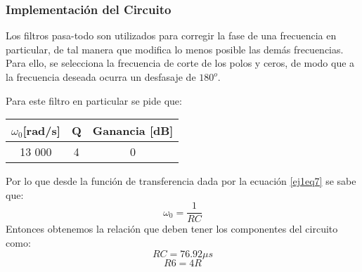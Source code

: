 \subsubsection{Implementación del Circuito}

Los filtros pasa-todo son utilizados para corregir la fase de una frecuencia en particular, de tal manera que modifica lo menos posible las demás frecuencias. Para ello, se selecciona la frecuencia de corte de los polos y ceros, de modo que a la frecuencia deseada ocurra un desfasaje de $180^o$. 

Para este filtro en particular se pide que:

\begin{table}[h]
\centering
\begin{tabular}{ccc}
\hline
$\omega_0${[}rad/s{]} & Q & Ganancia {[}dB{]} \\ \hline
13 000        & 4 & 0                 \\ \hline
\end{tabular}
\end{table}

Por lo que desde la función de transferencia dada por la ecuación \ref{ej1eq7} se sabe que:
$$\omega_0 = \frac{1}{RC}$$
Entonces obtenemos la relación que deben tener los componentes del circuito como:
$$RC = 76. 92\mu s$$
$$R6 = 4R$$

